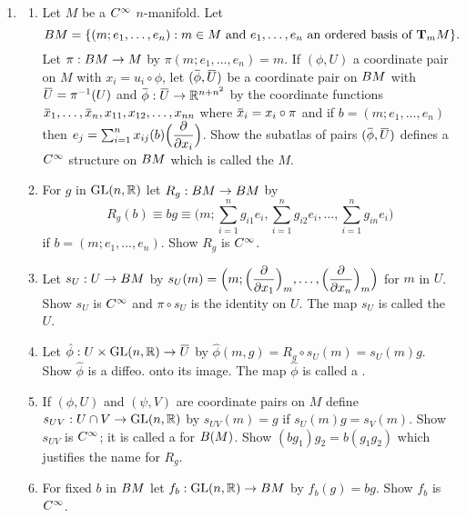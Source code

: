 \documentclass[../main]{subfiles}
\begin{document}
\begin{enumerate}
\item\label{pro:22}
\begin{enumerate}[label=(\roman{enumii})]
    \item Let $M$ be a $\CInfty$ $n$-manifold. Let
    \[\basisBundle{M}=\{(m; e_1, \dots, e_n): m \in M \text{ and } e_1, \dots, e_n \text{ an ordered basis of }\tangentspace{M}{m}\}.\]
    Let $\pi: \basisBundle{M} \functionMaps M$ by $\pi(m; e_1, \dots, e_n) = m$. If $(\phi,U)$ a coordinate pair on $M$ with $x_i = u_i \circ \phi$, let $(\xoverline{\phi}, \xoverline{U})$ be a coordinate pair on $\basisBundle{M}$ with $\xoverline{U} = \pi\inv(U)$ and $\xoverline{\phi}: \xoverline{U} \functionMaps \bR^{n+n^2}$ by the coordinate functions $\xoverline{x}_1, \dots, \xoverline{x}_n, x_{1  1}, x_{1  2}, \dots, x_{n  n}$ where $\xoverline{x}_i = x_i \circ \pi$ and if $b = (m; e_1, \dots, e_n)$ then $e_j = \sum_{i=1} ^n x_{i  j}(b)\Big(\pdv{}{x_i}\Big)$. Show the subatlas of pairs $(\xoverline{\phi}, \xoverline{U})$ defines a $\CInfty$ structure on $\basisBundle{M}$ which is called the  $M$. 
    \item For $g$ in $\GL(n,\bR)$ let $R_g : \basisBundle{M} \functionMaps \basisBundle{M}$ by 
    \[
    R_g (b) \equiv bg \equiv \bigg(m; \sum_{i=1} ^n g_{i  1}e_i, \sum_{i=1} ^n g_{i  2} e_i, \dots, \sum_{i=1} ^n g_{i  n} e_i\bigg)
    \]
    if $b=(m; e_1, \dots, e_n)$. Show $R_g$ is $\CInfty$.
    \item Let $s_U: U \functionMaps \basisBundle{M}$ by $s_U (m) =\Big(m; \Big(\pdv{}{x_1}\Big)_m, \dots, \Big(\pdv{}{x_n}\Big)_m\Big)$ for $m$ in $U$. Show $s_U$ is $\CInfty$ and $\pi \circ s_U$ is the identity on $U$. The map $s_U$ is called the  $U$.
    \item Let $\hat{\phi}: U \times \GL(n,\bR) \functionMaps \xoverline{U}$ by $\hat{\phi}(m,g) = R_g \circ s_U (m) = s_U (m)g$. Show $\hat{\phi}$ is a diffeo. onto its image. The map $\hat{\phi}$ is called a .
    \item If $(\phi, U)$ and $(\psi, V)$ are coordinate pairs on $M$ define $s_{U  V}: U \cap V \functionMaps \GL(n,\bR)$ by $s_{U  V} (m) = g$ if $s_U (m)g = s_V (m).$ Show $s_{U  V}$ is $\CInfty$; it is called a  for $\basisBundle(M)$. Show $(bg_1)g_2 = b(g_1 g_2)$ which justifies the name  for $R_g$.
    \item For fixed $b$ in $\basisBundle{M}$ let $f_b : \GL(n,\bR) \functionMaps \basisBundle{M}$ by $f_b (g) = bg$. Show $f_b$ is $\CInfty$.

\end{enumerate}
\end{enumerate}
\end{document}
